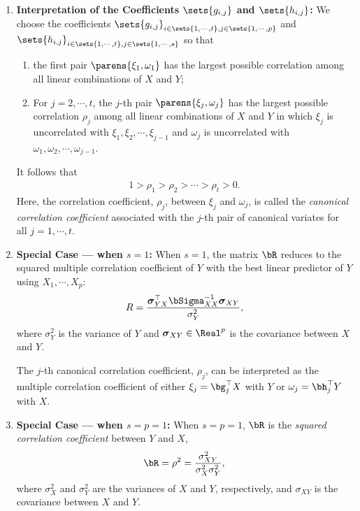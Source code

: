 \documentclass[12pt]{article}
\begin{document}
\begin{enumerate}[label=\textbf{\arabic*.}]
	\item \textbf{Interpretation of the Coefficients $\sets{g_{i,j}}$ and $\sets{h_{i,j}}$:} We choose the coefficients $\sets{g_{i,j}}_{i \in \sets{1, \cdots, t}, j \in \sets{1, \cdots, p}}$ and $\sets{h_{i,j}}_{i \in \sets{1, \cdots, t}, j \in \sets{1, \cdots, s}}$ so that 
	\begin{enumerate}
		\item the first pair $\parens{\xi_1, \omega_1}$ has the largest possible correlation among all linear combinations of $X$ and $Y$; 
		\item For $j = 2, \cdots, t$, the $j$-th pair $\parens{\xi_j, \omega_j}$ has the largest possible correlation $\rho_j$ among all linear combinations of $X$ and $Y$ in which $\xi_j$ is uncorrelated with $\xi_1, \xi_2, \cdots, \xi_{j-1}$ and $\omega_j$ is uncorrelated with $\omega_1, \omega_2, \cdots, \omega_{j-1}$. 
	\end{enumerate}
	It follows that 
	\begin{align}
		1 > \rho_1 > \rho_2 > \cdots > \rho_t > 0. 
	\end{align}
	Here, the correlation coefficient, $\rho_j$, between $\xi_j$ and $\omega_j$, is called the \textit{canonical correlation coefficient} associated with the $j$-th pair of canonical variates for all $j = 1, \cdots, t$. 
	
	\item \textbf{Special Case --- when $s = 1$:} When $s = 1$, the matrix $\bR$ reduces to the squared multiple correlation coefficient of $Y$ with the best linear predictor of $Y$ using $X_1, \cdots, X_p$: 
	\begin{align*}
		R = \frac{\boldsymbol{\sigma}^\top_{YX} \bSigma_{XX}^{-1} \boldsymbol{\sigma}_{XY}}{\sigma_Y^2}, 
	\end{align*}
	where $\sigma^2_Y$ is the variance of $Y$ and $\boldsymbol{\sigma}_{XY} \in \Real^p$ is the covariance between $X$ and $Y$. 
	
	The $j$-th canonical correlation coefficient, $\rho_j$, can be interpreted as the multiple correlation coefficient of either $\xi_j = \bg_j^\top X$ with $Y$ or $\omega_j = \bh_j^\top Y$ with $X$. 
	
	\item \textbf{Special Case --- when $s = p = 1$:} When $s = p = 1$, $\bR$ is the \emph{squared correlation coefficient} between $Y$ and $X$, 
	\begin{align*}
		\bR = \rho^2 = \frac{\sigma_{XY}^2}{\sigma_{X}^2 \sigma_{Y}^2}, 
	\end{align*}
	where $\sigma_{X}^2$ and $\sigma_{Y}^2$ are the variances of $X$ and $Y$, respectively, and $\sigma_{XY}$ is the covariance between $X$ and $Y$. 
	

\end{enumerate}
\end{document}
